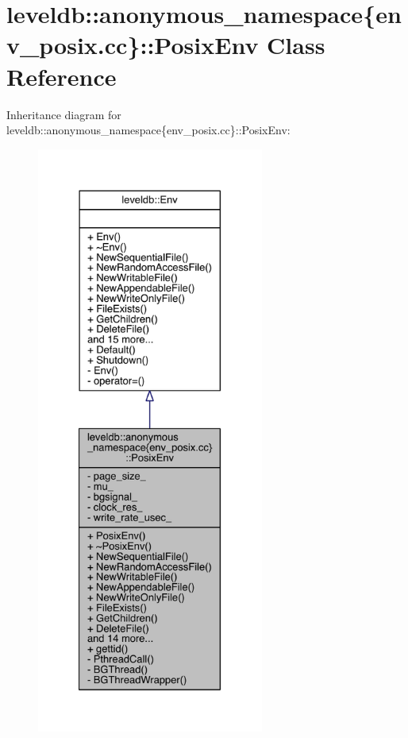 \hypertarget{classleveldb_1_1anonymous__namespace_02env__posix_8cc_03_1_1_posix_env}{}\section{leveldb\+:\+:anonymous\+\_\+namespace\{env\+\_\+posix.\+cc\}\+:\+:Posix\+Env Class Reference}
\label{classleveldb_1_1anonymous__namespace_02env__posix_8cc_03_1_1_posix_env}


Inheritance diagram for leveldb\+:\+:anonymous\+\_\+namespace\{env\+\_\+posix.\+cc\}\+:\+:Posix\+Env\+:
\nopagebreak
\begin{figure}[H]
\begin{center}
\leavevmode
\includegraphics[height=550pt]{classleveldb_1_1anonymous__namespace_02env__posix_8cc_03_1_1_posix_env__inherit__graph}
\end{center}
\end{figure}


